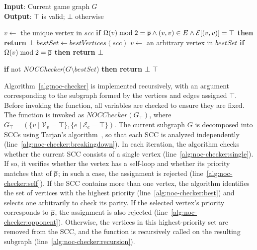 \documentclass[a4paper,fleqn]{cas-sc}
\begin{document}
\begin{algorithm}[htb]
\small
\caption{\textbf{\textit{NOCChecker}}}
\textbf{Input}: Current game graph $G$ \\
\textbf{Output}: $\top$ is valid; $\bot$ otherwise
\begin{algorithmic}[1]
     \label{alg:noc-checker:breakingdown}
         \label{alg:noc-checker:single}
            \STATE $v \gets$ the unique vertex in $scc$
            \STATE \textbf{if }$\Omega(v) \bmod 2 = \overline{\mathsf{p}} \land (v,v) \in E \land \mathcal{E}[(v,v)] = \top$ \textbf{then return $\bot$} \label{alg:noc-checker:self}  
        \ELSE
            \STATE $bestSet \gets \textit{bestVertices}(scc)$ \label{alg:noc-checker:best}
            \STATE $v \gets$ an arbitrary vertex in $bestSet$
            \STATE \textbf{if }$\Omega(v) \bmod 2 = \overline{\mathsf{p}}$ \textbf{then return $\bot$} \label{alg:noc-checker:opponent}  

            \STATE \textbf{if }not \textit{NOCChecker}($G \setminus bestSet$) \textbf{then return $\bot$} \label{alg:noc-checker:recursion}
        \ENDIF
    \ENDFOR
    \RETURN $\top$
\end{algorithmic}
\label{alg:noc-checker}
\end{algorithm}

Algorithm~\ref{alg:noc-checker} is implemented recursively, with an argument corresponding to the subgraph formed by the vertices and edges assigned $\top$. Before invoking the function, all variables are checked to ensure they are fixed. The function is invoked as $\textit{NOCChecker}(G_\top)$, where $G_\top = (\{ v \mid \mathcal{V}_v = \top \}, \{ e \mid \mathcal{E}_e = \top \})$. The current subgraph $G$ is decomposed into SCCs using Tarjan’s algorithm~\citep{Tarjan:1972}, so that each SCC is analyzed independently (line~\ref{alg:noc-checker:breakingdown}).
%
In each iteration, the algorithm checks whether the current SCC consists of a single vertex (line~\ref{alg:noc-checker:single}). If so, it verifies whether the vertex has a self-loop and whether its priority matches that of $\overline{\mathsf{p}}$; in such a case, the assignment is rejected (line~\ref{alg:noc-checker:self}).
%
If the SCC contains more than one vertex, the algorithm identifies the set of vertices with the highest priority (line~\ref{alg:noc-checker:best}) and selects one arbitrarily to check its parity. If the selected vertex’s priority corresponds to $\overline{\mathsf{p}}$, the assignment is also rejected (line~\ref{alg:noc-checker:opponent}). Otherwise, the vertices in this highest-priority set are removed from the SCC, and the function is recursively called on the resulting subgraph (line~\ref{alg:noc-checker:recursion}).
\end{document}
